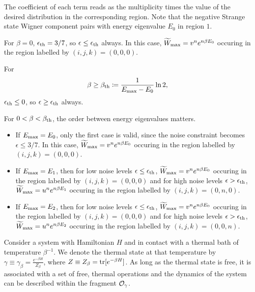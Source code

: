 \documentclass[pra,
aps,
twocolumn,
superscriptaddress,
groupedaddress,
nofootinbib,
reprint
]{revtex4-1}
\begin{document}
The coefficient of each term reads as the multiplicity times the value of the desired distribution in the corresponding region.
Note that the negative Strange state Wigner component pairs with energy eigenvalue $E_0$ in region $1$.

For $\beta = 0$, $\epsilon_{\rm{th}} = 3/7$, so $\epsilon \leq \epsilon_{\rm{th}}$ always.
In this case, $\widetilde{W}_{\rm{max}} = \wn^n e^{n\beta E_0}$ occuring in the region labelled by $(i,j,k) = (0,0,0)$.

For 	
\begin{equation}
	\beta \geq \beta_{\rm{th}} \coloneqq \frac{1}{E_{\rm{max}} - E_0} \ln2,
\end{equation}
$\epsilon_{\rm{th}} \leq 0$, so $\epsilon \geq \epsilon_{\rm{th}}$ always.

For $0 < \beta < \beta_{\rm{th}}$, the order between energy eigenvalues matters.
\begin{itemize}
\item If $E_{\rm{max}} = E_0$, only the first case is valid, since the noise constraint becomes $\epsilon \leq 3/7$.
In this case, $\widetilde{W}_{\rm{max}} = \wn^n e^{n\beta E_0}$ occuring in the region labelled by $(i,j,k) = (0,0,0)$.
\item If $E_{\rm{max}} = E_1$, then for low noise levels $\epsilon \leq \epsilon_{\rm{th}}$, $\widetilde{W}_{\rm{max}}  = \wn^n e^{n\beta E_0}$ occuring in the region labelled by $(i,j,k) = (0,0,0)$ and for high noise levels $\epsilon > \epsilon_{\rm{th}}$, $\widetilde{W}_{\rm{max}}  = \wp^n e^{n\beta E_1}$ occuring in the region labelled by $(i,j,k) = (0,n,0)$.
\item If $E_{\rm{max}} = E_2$, then for low noise levels $\epsilon \leq \epsilon_{\rm{th}}$, $\widetilde{W}_{\rm{max}}  = \wn^n e^{n\beta E_0}$ occuring in the region labelled by $(i,j,k) = (0,0,0)$ and for high noise levels $\epsilon > \epsilon_{\rm{th}}$, $\widetilde{W}_{\rm{max}}  = \wp^n e^{n\beta E_2}$ occuring in the region labelled by $(i,j,k) = (0,0,n)$.
\end{itemize}

Consider a system with Hamiltonian $H$ and in contact with a thermal bath of temperature $\beta^{-1}$.
We denote the thermal state at that temperature by $\gamma \equiv \gamma_\beta = \frac{e^{-\beta H}}{Z_\beta}$, where $Z \equiv Z_\beta = \tr[e^{-\beta H}]$.
As long as the thermal state is free, it is associated with a set of free, thermal operations and the dynamics of the system can be described within the fragment $\O_{\gamma}$.
\end{document}
